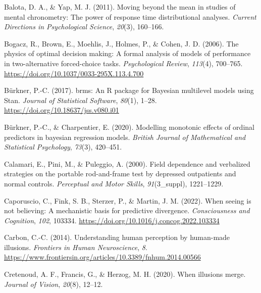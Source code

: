 \documentclass[
  man,floatsintext]{apa6}
\newlength{\cslhangindent}
\newlength{\cslentryspacingunit} %
\newenvironment{CSLReferences}[2] %
 {%
  \setlength{\parindent}{0pt}
  \ifodd #1
  \let\oldpar\par
  \def\par{\hangindent=\cslhangindent\oldpar}
  \fi
  \setlength{\parskip}{#2\cslentryspacingunit}
 }%
 {}
\begin{document}
\hypertarget{refs}{}
\begin{CSLReferences}{1}{0}
\leavevmode{}%
Balota, D. A., \& Yap, M. J. (2011). Moving beyond the mean in studies of mental chronometry: The power of response time distributional analyses. \emph{Current Directions in Psychological Science}, \emph{20}(3), 160--166.

\leavevmode{}%
Bogacz, R., Brown, E., Moehlis, J., Holmes, P., \& Cohen, J. D. (2006). The physics of optimal decision making: A formal analysis of models of performance in two-alternative forced-choice tasks. \emph{Psychological Review}, \emph{113}(4), 700--765. \url{https://doi.org/10.1037/0033-295X.113.4.700}

\leavevmode{}%
Bürkner, P.-C. (2017). {brms}: An {R} package for {Bayesian} multilevel models using {Stan}. \emph{Journal of Statistical Software}, \emph{80}(1), 1--28. \url{https://doi.org/10.18637/jss.v080.i01}

\leavevmode{}%
Bürkner, P.-C., \& Charpentier, E. (2020). Modelling monotonic effects of ordinal predictors in bayesian regression models. \emph{British Journal of Mathematical and Statistical Psychology}, \emph{73}(3), 420--451.

\leavevmode{}%
Calamari, E., Pini, M., \& Puleggio, A. (2000). Field dependence and verbalized strategies on the portable rod-and-frame test by depressed outpatients and normal controls. \emph{Perceptual and Motor Skills}, \emph{91}(3\_suppl), 1221--1229.

\leavevmode{}%
Caporuscio, C., Fink, S. B., Sterzer, P., \& Martin, J. M. (2022). When seeing is not believing: A mechanistic basis for predictive divergence. \emph{Consciousness and Cognition}, \emph{102}, 103334. \url{https://doi.org/10.1016/j.concog.2022.103334}

\leavevmode{}%
Carbon, C.-C. (2014). Understanding human perception by human-made illusions. \emph{Frontiers in Human Neuroscience}, \emph{8}. \url{https://www.frontiersin.org/articles/10.3389/fnhum.2014.00566}

\leavevmode{}%
Cretenoud, A. F., Francis, G., \& Herzog, M. H. (2020). When illusions merge. \emph{Journal of Vision}, \emph{20}(8), 12--12.


\end{CSLReferences}
\end{document}
